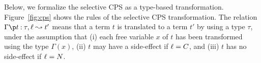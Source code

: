 
Below, we formalize the selective CPS as a type-based transformation.
Figure~\ref{fig:cps} shows the rules of the selective CPS
transformation.  The relation $\CPS{\Gamma}{t}{\tau}{\ell}{t'}$ means
that a term $t$ is translated to a term $t'$ by using a type $\tau$,
under the assumption that (i) each free variable $x$ of $t$ has been
transformed using the type $\Gamma(x)$, (ii) $t$ may have a side-effect if
$\ell=C$, and (iii) $t$ has no side-effect if $\ell=N$.

